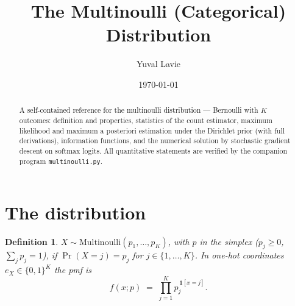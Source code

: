 \documentclass[11pt]{article}
\title{The Multinoulli (Categorical) Distribution}
\author{Yuval Lavie}
\date{\today}
\newtheorem{definition}{Definition}
\theoremstyle{remark}
\begin{document}
\maketitle

\begin{abstract}
A self-contained reference for the multinoulli distribution ---
Bernoulli with $K$ outcomes: definition and properties, statistics of
the count estimator, maximum likelihood and maximum a posteriori
estimation under the Dirichlet prior (with full derivations),
information functions, and the numerical solution by stochastic
gradient descent on softmax logits. All quantitative statements are
verified by the companion program \texttt{multinoulli.py}.
\end{abstract}

\section{The distribution}

\begin{definition}
$X \sim \mathrm{Multinoulli}(p_1, \dots, p_K)$, with $p$ in the
simplex ($p_j \ge 0$, $\sum_j p_j = 1$), if $\Pr(X = j) = p_j$ for
$j \in \{1, \dots, K\}$. In one-hot coordinates
$e_X \in \{0,1\}^K$ the pmf is
\begin{equation}
  f(x; p) \;=\; \prod_{j=1}^{K} p_j^{\,\mathbf{1}[x = j]}.
  \label{eq:pmf}
\end{equation}
\end{definition}

\begin{center}
\end{center}
\end{document}
